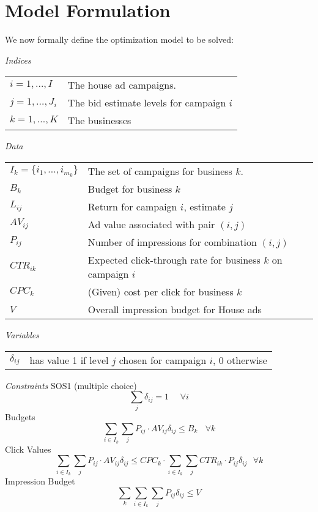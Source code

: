 \documentclass[finalversion,simpleeqnnos]{yrl}
\begin{document}
\section{Model Formulation}   

We now formally define the optimization model to be solved:

\vskip 5pt
{\sl Indices} \nopagebreak
\vskip 5pt
   \begin{tabular}{ll}
     $i = 1,...,I$ & The house ad campaigns.
   \\$j = 1,...,J_i$ &  The bid estimate levels for campaign $i$
   \\$k = 1,...,K$ &  The businesses
   \end{tabular}
\vskip 5pt
{\sl Data}  \nopagebreak
\vskip 5pt
   \begin{tabular}{ll}
    $ I_{k} = \{i_1, \ldots, i_{m_k}\}$    & The set of campaigns for business $k$.
     \\ $B_k$ & Budget for business $k$
   \\$L_{ij}$ & Return for campaign $i$, estimate $j$
   \\ $AV_{ij}$ & Ad value associated with pair $(i,j)$
   \\ $P_{ij}$ & Number of impressions for combination $(i,j)$
   \\ $CTR_{ik}$ & Expected click-through rate for business $k$ on campaign $i$
   \\ $CPC_k$ & (Given) cost per click for business $k$
   \\$V$ & Overall impression budget for House ads
\end{tabular}
\vskip 5pt
{\sl Variables}
\vskip 5pt
   \begin{tabular}{ll}
      $\delta_{ij}$   &  has value 1 if level $j$ chosen for campaign $i$, 0 otherwise
   \end{tabular}
\vskip 5pt

{\sl Constraints}
\vskip 5pt
SOS1 (multiple choice)
 \begin{equation}\label{conv}
	\sum_{j} \delta_{ij} = 1 \ \ \ \ \ \ \forall i
 \end{equation}
\vskip 5pt
Budgets
 \begin{equation}\label{budget}
     \sum_{i\in I_k}\sum_j P_{ij}\cdot AV_{ij} \delta_{ij} \le B_{k} \ \ \ \ 
     \forall k
 \end{equation}
\vskip 5pt
Click Values
 \begin{equation}\label{clicks}
     \sum_{i\in I_k}\sum_j P_{ij}\cdot AV_{ij} \delta_{ij} \le 
     CPC_k \cdot \sum_{i\in I_k}\sum_j CTR_{ik} \cdot P_{ij} \delta_{ij}\ \ \
     \forall k
 \end{equation}
\vskip 5pt
Impression Budget
 \begin{equation}\label{i-budget}
     \sum_k \sum_{i\in I_k}\sum_j P_{ij}\delta_{ij} \le V
 \end{equation}
\end{document}
